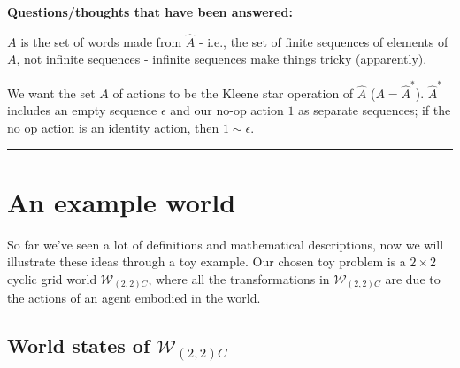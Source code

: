{	\textbf{Questions/thoughts that have been answered:}
	\begin{compactitem}
		\item $A$ is the set of words made from $\hat{A}$ - i.e., the set of finite sequences of elements of $A$, not infinite sequences - infinite sequences make things tricky (apparently).

		\item We want the set $A$ of actions to be the Kleene star operation of $\hat{A}$ ($A = \hat{A}^{\ast}$). $\hat{A}^{\ast}$ includes an empty sequence $\epsilon$ and our no-op action $1$ as separate sequences; if the no op action is an identity action, then $1 \sim \epsilon$.
	\end{compactitem}
	\noindent\rule{\textwidth}{1mm}
}

\section{An example world}\label{sec:an_example_world}

So far we've seen a lot of definitions and mathematical descriptions, now we will illustrate these ideas through a toy example.
Our chosen toy problem is a $2\times 2$ cyclic grid world $\mathscr{W}_{(2,2)C}$, where all the transformations in $\mathscr{W}_{(2,2)C}$ are due to the actions of an agent embodied in the world.

\subsection{World states of $\mathscr{W}_{(2,2)C}$}\label{sec:World states of example}


